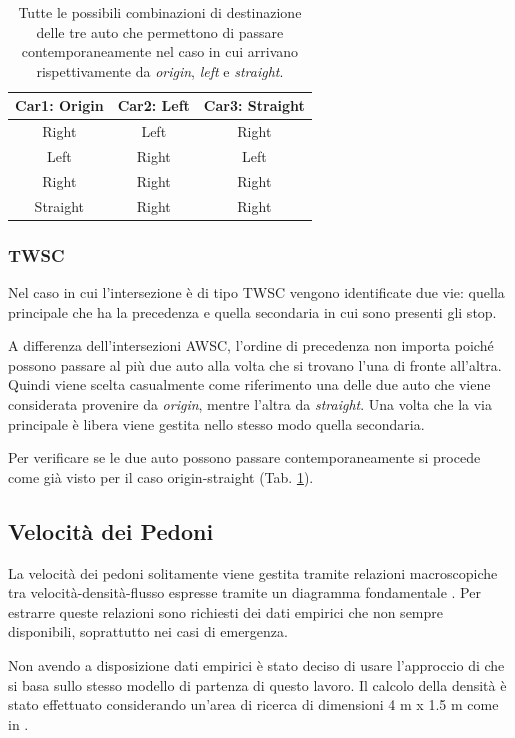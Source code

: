 \begin{table}[ht]
    \centering
    \begin{tabular}{|c|c|c|}
        \hline
        \textbf{Car1: Origin} & \textbf{Car2: Left} & \textbf{Car3: Straight} \\ \hline
        Right                 & Left                & Right                   \\ \hline
        Left                  & Right               & Left                    \\ \hline
        Right                 & Right               & Right                   \\ \hline
        Straight              & Right               & Right                   \\ \hline
    \end{tabular}
    \caption{Tutte le possibili combinazioni di destinazione delle tre auto che permettono
        di passare contemporaneamente nel caso in cui arrivano rispettivamente da \textit{origin}, \textit{left} e \textit{straight}.}
    \label{tab:origin-left-straight}
\end{table}

\subsubsection{TWSC}
\label{subsubsec:TWSC}
Nel caso in cui l'intersezione è di tipo TWSC vengono identificate due vie: quella principale che ha la precedenza e quella
secondaria in cui sono presenti gli stop.

A differenza dell'intersezioni AWSC, l'ordine di precedenza non importa poiché possono passare al più due auto alla volta
che si trovano l'una di fronte all'altra.
Quindi viene scelta casualmente come riferimento una delle due auto che viene considerata provenire da \textit{origin}, mentre
l'altra da \textit{straight}.
%
Una volta che la via principale è libera viene gestita nello stesso modo quella secondaria.

Per verificare se le due auto possono passare contemporaneamente si procede come già visto per il caso origin-straight (Tab. \ref{tab:origin-left-straight}).


\subsection{Velocità dei Pedoni}
La velocità dei pedoni solitamente viene gestita tramite relazioni macroscopiche tra velocità-densità-flusso
espresse tramite un diagramma fondamentale \parencite{nikolic2016probabilistic}.
Per estrarre queste relazioni sono richiesti dei dati empirici che non sempre disponibili, soprattutto nei casi di emergenza.

Non avendo a disposizione dati empirici è stato deciso di usare l'approccio di \textcite{wang2021novel} 
che si basa sullo stesso modello di partenza di questo lavoro.
%
Il calcolo della densità è stato effettuato considerando un'area di ricerca di dimensioni 4 m x 1.5 m 
come in \textcite{goto2012tsunami, wang2021novel}.
